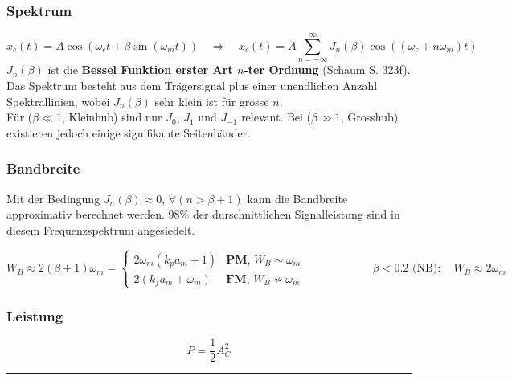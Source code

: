 \subsubsection{Spektrum}
$$x_c(t) = A \cos(\omega_c t + \beta \sin(\omega_m t)) \quad \Rightarrow \quad 
x_c(t) = A \sum\limits_{n=-\infty}^{\infty} J_n(\beta) \cos((\omega_c + n \omega_m)t)$$
\textbf{$J_n(\beta)$} ist die \textbf{Bessel Funktion erster Art $n$-ter Ordnung} (Schaum
S. 323f). Das Spektrum besteht aus dem Trägersignal plus einer unendlichen Anzahl Spektrallinien,
wobei $J_n(\beta)$ sehr klein ist für grosse $n$. \\
Für ($\beta \ll 1$, Kleinhub) sind nur $J_0$, $J_1$ und $ J_{-1}$ relevant. Bei ($\beta \gg 1$,
Grosshub) existieren jedoch einige signifikante Seitenbänder.

\subsubsection{Bandbreite}
Mit der Bedingung $J_n(\beta) \approx 0, \,\forall (n > \beta + 1)$ kann die Bandbreite approximativ
berechnet werden. 98\% der durschnittlichen Signalleistung sind in diesem
Frequenzspektrum angesiedelt. 

\begin{center}
$W_B \approx 2(\beta + 1) \omega_m = 
	\begin{cases}
  		2 \omega_m (k_p a_m + 1) & \textbf{PM},\, W_B \sim \omega_m \\
  		2(k_f a_m + \omega_m) & \textbf{FM},\, W_B \nsim \omega_m \end{cases} \qquad
  		\qquad \qquad \beta < 0.2 \text{ (NB)}: \quad W_{B} \approx 2 \omega_m
$
\end{center}

\subsubsection{Leistung }
$$P = \frac12 A_C^2$$
\hrule


